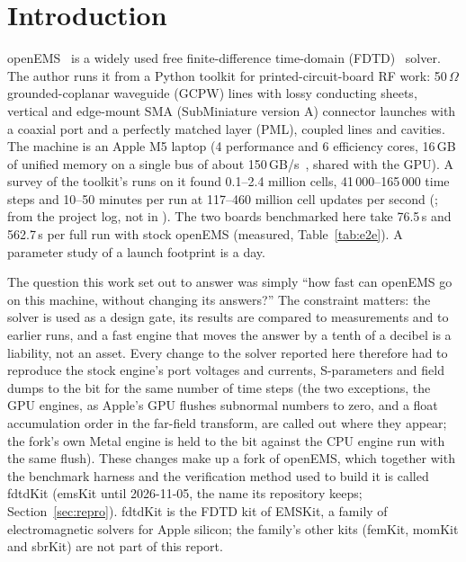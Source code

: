 \section{Introduction}

openEMS~\cite{liebig2013} is a widely used free finite-difference time-domain (FDTD)~\cite{yee1966,taflove} solver.
The author runs it from a Python toolkit for printed-circuit-board RF work: 50\,$\Omega$ grounded-coplanar waveguide
(GCPW) lines with lossy conducting sheets, vertical and edge-mount SMA (SubMiniature version A) connector launches with
a coaxial port and a perfectly matched layer (PML), coupled lines and cavities. The machine is an Apple M5 laptop (4
performance and 6 efficiency cores, 16\,GB of unified memory on a single bus of about 150\,GB/s~\cite{m5}, shared with
the GPU). A survey of the toolkit's runs on it found 0.1--2.4 million cells, 41\,000--165\,000 time steps and 10--50
minutes per run at 117--460 million cell updates per second (\MC; from the project log, not in ). The
two boards benchmarked here take 76.5\,s and 562.7\,s per full run with stock openEMS (measured,
Table~\ref{tab:e2e}). A parameter study of a launch footprint is a day.

The question this work set out to answer was simply ``how fast can openEMS go on this machine, without changing its
answers?'' The constraint matters: the solver is used as a design gate, its results are compared to measurements and
to earlier runs, and a fast engine that moves the answer by a tenth of a decibel is a liability, not an asset. Every
change to the solver reported here therefore had to reproduce the stock engine's port voltages and currents,
S-parameters and field dumps to the bit for the same number of time steps (the two exceptions, the GPU engines, as
Apple's GPU flushes subnormal numbers to zero, and a float accumulation order in the far-field transform, are called
out where they appear; the fork's own Metal engine is held to the bit against the CPU engine run with the same flush).
These changes make up a fork of openEMS, which together with the benchmark harness and the verification method used
to build it is called fdtdKit (emsKit until 2026-11-05, the name its repository keeps; Section~\ref{sec:repro}).
fdtdKit is the FDTD kit of EMSKit, a family of electromagnetic solvers for Apple silicon; the family's other kits
(femKit, momKit and sbrKit) are not part of this report.

